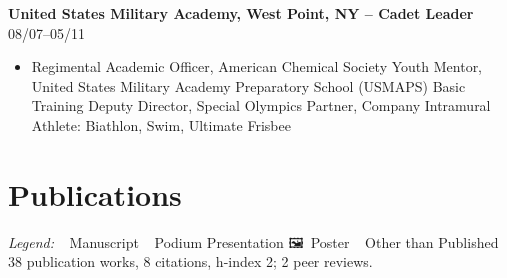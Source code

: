 \documentclass[9pt,a4paper]{article}
\newcommand{\emojiDoc}{{\emoji 📑}}
\newcommand{\emojiTalk}{{\emoji 🎤}}
\newcommand{\emojiPoster}{{\emoji 🖼}}
\newcommand{\emojiOther}{{\emoji 📝}}
\begin{document}
\textbf{United States Military Academy, West Point, NY -- Cadet Leader} \hfill 08/07--05/11\\
\begin{itemize}[leftmargin=*]
  \item Regimental Academic Officer, American Chemical Society Youth Mentor, United States Military Academy
    Preparatory School (USMAPS) Basic Training Deputy Director, Special Olympics Partner, Company Intramural Athlete: Biathlon, Swim, Ultimate Frisbee  
\end{itemize}

\section*{Publications}

\textit{Legend:}
\emojiDoc\ Manuscript \quad
\emojiTalk\ Podium Presentation \quad
\emojiPoster\ Poster \quad
\emojiOther\ Other than Published\\
38 publication works, 8 citations, h-index 2; 2 peer reviews.
\end{document}
